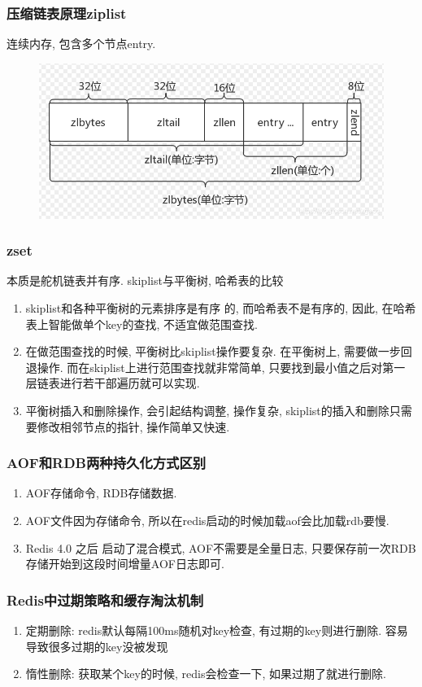 \documentclass[UTF8]{ctexart}
\begin{document}
\subsubsection{压缩链表原理ziplist}
连续内存, 包含多个节点entry.
\begin{figure}
	\centering
	\includegraphics[width=0.7\linewidth]{figures/ziplist.png}
	\caption{}
	\label{fig:ziplist}
\end{figure}
\subsubsection{zset}
本质是舵机链表并有序.
skiplist与平衡树, 哈希表的比较
\begin{enumerate}
	\item skiplist和各种平衡树的元素排序是有序 的, 而哈希表不是有序的, 因此, 在哈希表上智能做单个key的查找, 不适宜做范围查找.
	\item 在做范围查找的时候, 平衡树比skiplist操作要复杂. 在平衡树上, 需要做一步回退操作. 而在skiplist上进行范围查找就非常简单, 只要找到最小值之后对第一层链表进行若干部遍历就可以实现.
	\item 平衡树插入和删除操作, 会引起结构调整, 操作复杂, skiplist的插入和删除只需要修改相邻节点的指针, 操作简单又快速.
\end{enumerate}

\subsubsection{AOF和RDB两种持久化方式区别}
\begin{enumerate}
	\item AOF存储命令, RDB存储数据.
	\item AOF文件因为存储命令, 所以在redis启动的时候加载aof会比加载rdb要慢. 
	\item Redis 4.0 之后 启动了混合模式, AOF不需要是全量日志, 只要保存前一次RDB存储开始到这段时间增量AOF日志即可.
\end{enumerate}
\subsubsection{Redis中过期策略和缓存淘汰机制}
\begin{enumerate}
	\item 定期删除: redis默认每隔100ms随机对key检查, 有过期的key则进行删除. 容易导致很多过期的key没被发现
	\item 惰性删除: 获取某个key的时候, redis会检查一下, 如果过期了就进行删除.
\end{enumerate}
\end{document}
